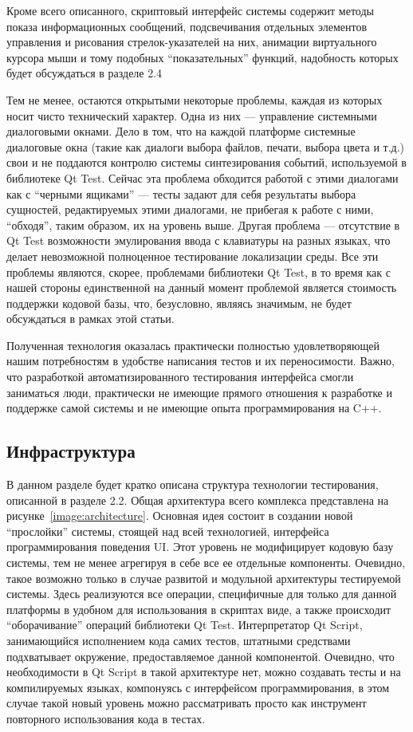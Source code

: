 \documentclass[conference]{IEEEtran}
\begin{document}
Кроме всего описанного, скриптовый интерфейс системы содержит методы показа информационных 
сообщений, подсвечивания отдельных элементов управления и рисования стрелок-указателей 
на них, анимации виртуального курсора мыши и тому подобных "`показательных"' функций, 
надобность которых будет обсуждаться в разделе 2.4

Тем не менее, остаются открытыми некоторые проблемы, каждая из которых носит чисто 
технический характер. Одна из них --- управление системными диалоговыми окнами. Дело в том, 
что на каждой платформе системные диалоговые окна (такие как диалоги выбора файлов, 
печати, выбора цвета и т.д.) свои и не поддаются контролю системы синтезирования событий, 
используемой в библиотеке Qt Test. Сейчас эта проблема обходится работой с этими диалогами 
как с "`черными ящиками"' --- тесты задают для себя результаты выбора сущностей, редактируемых 
этими диалогами, не прибегая к работе с ними, "`обходя"', таким образом, их на уровень выше. 
Другая проблема --- отсутствие в Qt Test возможности эмулирования ввода с клавиатуры 
на разных языках, что делает невозможной полноценное тестирование локализации среды. 
Все эти проблемы являются, скорее, проблемами библиотеки Qt Test, в то время как с 
нашей стороны единственной на данный момент проблемой является стоимость поддержки 
кодовой базы, что, безусловно, являясь значимым, не будет обсуждаться в рамках этой статьи.

Полученная технология оказалась практически полностью удовлетворяющей нашим потребностям 
в удобстве написания тестов и их переносимости. Важно, что разработкой автоматизированного 
тестирования интерфейса смогли заниматься люди, практически не имеющие прямого отношения 
к разработке и поддержке самой системы и не имеющие опыта программирования на C++.

\subsection{Инфраструктура}
В данном разделе будет кратко описана структура технологии тестирования, описанной 
в разделе 2.2. Общая архитектура всего комплекса представлена на рисунке~\ref{image:architecture}. Основная 
идея состоит в создании новой "`прослойки"' системы, стоящей над всей технологией, 
интерфейса программирования поведения UI. Этот уровень не модифицирует кодовую базу 
системы, тем не менее агрегируя в себе все ее отдельные компоненты. Очевидно, такое 
возможно только в случае развитой и модульной архитектуры тестируемой системы. Здесь 
реализуются все операции, специфичные для только для данной платформы в удобном для 
использования в скриптах виде, а также происходит "`оборачивание"' операций библиотеки Qt Test. 
Интерпретатор Qt Script, занимающийся исполнением кода самих тестов, штатными средствами 
подхватывает окружение, предоставляемое данной компонентой. Очевидно, что необходимости в 
Qt Script в такой архитектуре нет, можно создавать тесты и на компилируемых языках, 
компонуясь с интерфейсом программирования, в этом случае такой новый уровень можно 
рассматривать просто как инструмент повторного использования кода в тестах.
\end{document}
